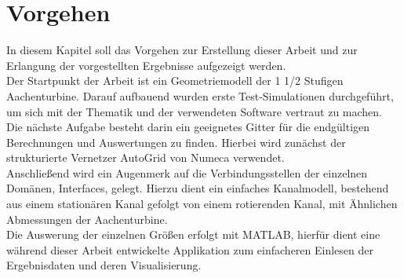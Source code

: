 \chapter{Vorgehen}
In diesem Kapitel soll das Vorgehen zur Erstellung dieser Arbeit und zur Erlangung der vorgestellten Ergebnisse aufgezeigt werden. \\
Der Startpunkt der Arbeit ist ein Geometriemodell der 1 1/2 Stufigen Aachenturbine. Darauf aufbauend wurden erste Test-Simulationen durchgeführt, um sich mit der Thematik und der verwendeten Software vertraut zu machen. Die nächste Aufgabe besteht darin ein geeignetes Gitter für die endgültigen Berechnungen und Auswertungen zu finden. Hierbei wird zunächst der strukturierte Vernetzer AutoGrid von Numeca verwendet.\\
Anschließend wird ein Augenmerk auf die Verbindungsstellen der einzelnen Domänen, Interfaces, gelegt. Hierzu dient ein einfaches Kanalmodell, bestehend aus einem stationären Kanal gefolgt von einem rotierenden Kanal, mit Ähnlichen Abmessungen der Aachenturbine.\\ 
Die Auswerung der einzelnen Größen erfolgt mit MATLAB, hierfür dient eine während dieser Arbeit entwickelte Applikation zum einfacheren Einlesen der Ergebnisdaten und deren Visualisierung.    

